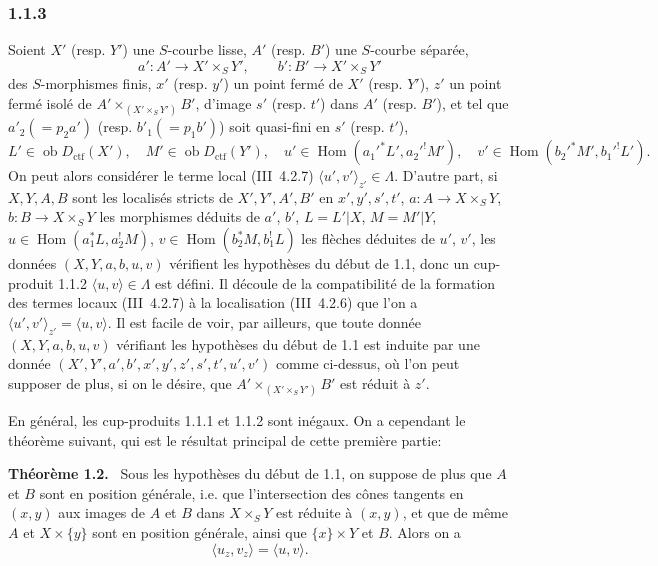 \documentclass[11pt]{article}
\newenvironment{statement}[1]{\par\medskip\noindent\textbf{#1.}\ }{\par\medskip}
\DeclareMathOperator{\Hom}{Hom}
\newcommand{\ob}{\operatorname{ob}}
\providecommand{\ctf}{\mathrm{ctf}}
\providecommand{\Hom}{\operatorname{Hom}}
\providecommand{\ob}{\operatorname{ob}}
\begin{document}
\subsubsection*{1.1.3}
Soient $X'$ (resp. $Y'$) une $S$-courbe lisse, $A'$ (resp. $B'$) une $S$-courbe séparée,
\[
a':A'\longrightarrow X'\times_S Y',
\qquad
b':B'\longrightarrow X'\times_S Y'
\]
des $S$-morphismes finis, $x'$ (resp. $y'$) un point fermé de $X'$ (resp. $Y'$), $z'$ un point fermé isolé de $A'\times_{(X'\times_S Y')}B'$, d'image $s'$ (resp. $t'$) dans $A'$ (resp. $B'$), et tel que $a'_2(=p_2a')$ (resp. $b'_1(=p_1b')$) soit quasi-fini en $s'$ (resp. $t'$),
\[
L'\in\ob D_{\ctf}(X'),\quad M'\in\ob D_{\ctf}(Y'),\quad
u'\in\Hom(a_1'^*L',a_2'^!M'),\quad v'\in\Hom(b_2'^*M',b_1'^!L').
\]
On peut alors considérer le terme local (III~4.2.7) $\langle u',v'\rangle_{z'}\in\Lambda$. D'autre part, si $X,Y,A,B$ sont les localisés stricts de $X',Y',A',B'$ en $x',y',s',t'$, $a:A\to X\times_S Y$, $b:B\to X\times_SY$ les morphismes déduits de $a'$, $b'$, $L=L'|X$, $M=M'|Y$, $u\in\Hom(a_1^*L,a_2^!M)$, $v\in\Hom(b_2^*M,b_1^!L)$ les flèches déduites de $u'$, $v'$, les données $(X,Y,a,b,u,v)$ vérifient les hypothèses du début de 1.1, donc un cup-produit 1.1.2 $\langle u,v\rangle\in\Lambda$ est défini. Il découle de la compatibilité de la formation des termes locaux (III~4.2.7) à la localisation (III~4.2.6) que l'on a $\langle u',v'\rangle_{z'}=\langle u,v\rangle$. Il est facile de voir, par ailleurs, que toute donnée $(X,Y,a,b,u,v)$ vérifiant les hypothèses du début de 1.1 est induite par une donnée $(X',Y',a',b',x',y',z',s',t',u',v')$ comme ci-dessus, où l'on peut supposer de plus, si on le désire, que $A'\times_{(X'\times_S Y')}B'$ est réduit à $z'$.

En général, les cup-produits 1.1.1 et 1.1.2 sont inégaux. On a cependant le théorème suivant, qui est le résultat principal de cette première partie:

\begin{statement}{Théorème 1.2}
Sous les hypothèses du début de 1.1, on suppose de plus que $A$ et $B$ sont en position générale, i.e. que l'intersection des cônes tangents en $(x,y)$ aux images de $A$ et $B$ dans $X\times_S Y$ est réduite à $(x,y)$, et que de même $A$ et $X\times\{y\}$ sont en position générale, ainsi que $\{x\}\times Y$ et $B$. Alors on a
\begin{equation}\tag{1.2.1}
\langle u_z,v_z\rangle=\langle u,v\rangle.
\end{equation}
\end{statement}
\end{document}

